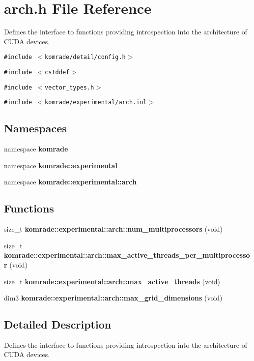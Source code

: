 \section{arch.h File Reference}
\label{arch_8h}
Defines the interface to functions providing introspection into the architecture of CUDA devices. 

{\tt \#include $<$komrade/detail/config.h$>$}\par
{\tt \#include $<$cstddef$>$}\par
{\tt \#include $<$vector\_\-types.h$>$}\par
{\tt \#include $<$komrade/experimental/arch.inl$>$}\par
\subsection*{Namespaces}
\begin{CompactItemize}
\item 
namespace {\bf komrade}
\item 
namespace {\bf komrade::experimental}
\item 
namespace \textbf{komrade::experimental::arch}
\end{CompactItemize}
\subsection*{Functions}
\begin{CompactItemize}
\item 
size\_\-t {\bf komrade::experimental::arch::num\_\-multiprocessors} (void)
\item 
size\_\-t {\bf komrade::experimental::arch::max\_\-active\_\-threads\_\-per\_\-multiprocessor} (void)
\item 
size\_\-t {\bf komrade::experimental::arch::max\_\-active\_\-threads} (void)
\item 
dim3 {\bf komrade::experimental::arch::max\_\-grid\_\-dimensions} (void)
\end{CompactItemize}


\subsection{Detailed Description}
Defines the interface to functions providing introspection into the architecture of CUDA devices. 

